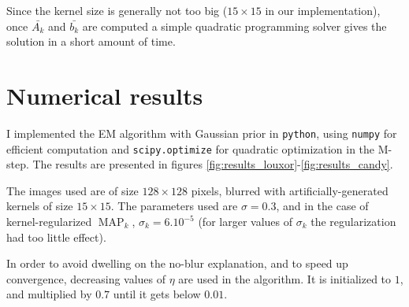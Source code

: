\documentclass[english,a4paper]{article}
\theoremstyle{plain}
\theoremstyle{definition}
\theoremstyle{remark}
\DeclareMathOperator{\MAP}{MAP}
\begin{document}
Since the kernel size is generally not too big ($15\times 15$ in our implementation), once $\bar{A_k}$ and $\bar{b_k}$ are computed a simple quadratic programming solver gives the solution in a short amount of time.

\section{Numerical results}
I implemented the EM algorithm with Gaussian prior in \texttt{python}, using \texttt{numpy} for efficient computation and \texttt{scipy.optimize} for quadratic optimization in the M-step.
The results are presented in figures \ref{fig:results_louxor}-\ref{fig:results_candy}.



The images used are of size $128\times 128$ pixels, blurred with artificially-generated kernels of size $15\times 15$. The parameters used are $\sigma = 0.3$, and in the case of kernel-regularized $\MAP_k$, $\sigma_k = 6.10^{-5}$ (for larger values of $\sigma_k$ the regularization had too little effect).

In order to avoid dwelling on the no-blur explanation, and to speed up convergence, decreasing values of $\eta$ are used in the algorithm. It is initialized to $1$, and multiplied by $0.7$ until it gets below $0.01$.
\end{document}
